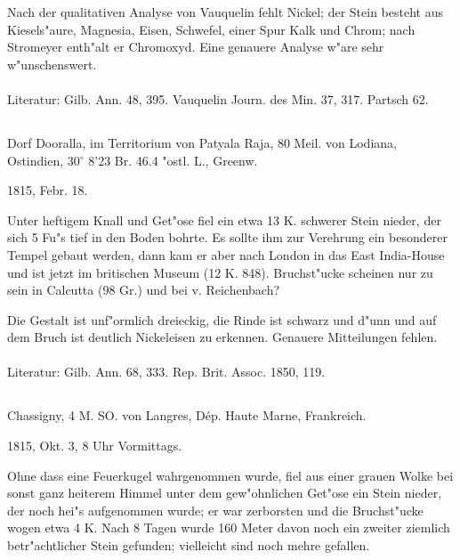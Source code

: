 \documentclass[a4paper, 11pt, oneside]{article}
\begin{document}
Nach der qualitativen Analyse von Vauquelin fehlt Nickel; der Stein besteht aus Kiesels"aure, Magnesia, Eisen, Schwefel, einer Spur Kalk und Chrom; nach Stromeyer enth"alt er Chromoxyd. Eine genauere Analyse w"are sehr w"unschenswert.
\normalsize
\paragraph{}
Literatur: Gilb. Ann. 48, 395. Vauquelin Journ. des Min. 37, 317. Partsch 62.
\subsection{}
\LARGE
\paragraph{}
Dorf Dooralla, im Territorium von Patyala Raja, 80 Meil. von Lodiana, Ostindien, 30$^\circ$ 8'23 Br. 46.4 "ostl. L., Greenw.

1815, Febr. 18.

Unter heftigem Knall und Get"ose fiel ein etwa 13 K. schwerer Stein nieder, der sich 5 Fu"s tief in den Boden bohrte. Es sollte ihm zur Verehrung ein besonderer Tempel gebaut werden, dann kam er aber nach London in das East India-House und ist jetzt im britischen Museum (12 K. 848). Bruchst"ucke scheinen nur zu sein in Calcutta (98 Gr.) und bei v. Reichenbach?

Die Gestalt ist unf"ormlich dreieckig, die Rinde ist schwarz und d"unn und auf dem Bruch ist deutlich Nickeleisen zu erkennen. Genauere Mitteilungen fehlen.
\normalsize
\paragraph{}
Literatur: Gilb. Ann. 68, 333. Rep. Brit. Assoc. 1850, 119.
\subsection{}
\LARGE
\paragraph{}
Chassigny, 4 M. SO. von Langres, Dép. Haute Marne, Frankreich.

1815, Okt. 3, 8 Uhr Vormittags.

Ohne dass eine Feuerkugel wahrgenommen wurde, fiel aus einer grauen Wolke bei sonst ganz heiterem Himmel unter dem gew"ohnlichen Get"ose ein Stein nieder, der noch hei"s aufgenommen wurde; er war zerborsten und die Bruchst"ucke wogen etwa 4 K. Nach 8 Tagen wurde 160 Meter davon noch ein zweiter ziemlich betr"achtlicher Stein gefunden; vielleicht sind noch mehre gefallen.
\end{document}
